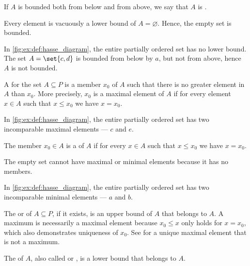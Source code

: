 \begin{definition}
\begin{thmenum}
\begin{minipage}[t]{0.45\textwidth}
      If \( A \) is bounded both from below and from above, we say that \( A \) is .

      Every element is vacuously a lower bound of \( A = \varnothing \). Hence, the empty set is bounded.

      In \cref{fig:ex:def:hasse_diagram}, the entire partially ordered set has no lower bound. The set \( A = \set{ c, d } \) is bounded from below by \( a \), but not from above, hence \( A \) is not bounded.
    \end{minipage}

    \begin{minipage}[t]{0.45\textwidth}
      A  for the set \( A \subseteq P \) is a member \( x_0 \) of \( A \) such that there is no greater element in \( A \) than \( x_0 \). More precisely, \( x_0 \) is a maximal element of \( A \) if for every element \( x \in A \) such that \( x \leq x_0 \) we have \( x = x_0 \).

      In \cref{fig:ex:def:hasse_diagram}, the entire partially ordered set has two incomparable maximal elements --- \( c \) and \( e \).
    \end{minipage}
    \hspace{0.02\textwidth}
    \begin{minipage}[t]{0.45\textwidth}
      The member \( x_0 \in A \) is a  of \( A \) if for every \( x \in A \) such that \( x \leq x_0 \) we have \( x = x_0 \).

      The empty set cannot have maximal or minimal elements because it has no members.

      In \cref{fig:ex:def:hasse_diagram}, the entire partially ordered set has two incomparable minimal elements --- \( a \) and \( b \).
    \end{minipage}

    \begin{minipage}[t]{0.45\textwidth}
      The  or  of \( A \subseteq P \), if it exists, is an upper bound of \( A \) that belongs to \( A \). A maximum is necessarily a maximal element because \( x_0 \leq x \) only holds for \( x = x_0 \), which also demonstrates uniqueness of \( x_0 \). See  for a unique maximal element that is not a maximum.
    \end{minipage}
    \hspace{0.02\textwidth}
    \begin{minipage}[t]{0.45\textwidth}
      The  of \( A \), also called  or , is a lower bound that belongs to \( A \).


\end{minipage}
\end{thmenum}
\end{definition}
